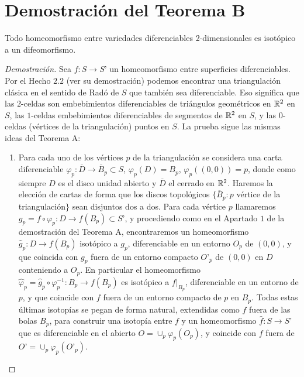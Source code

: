 \section{Demostración del Teorema B}
	\begin{teorb}
		Todo homeomorfismo entre variedades diferenciables 2-dimensionales es isotópico a un difeomorfismo.
	\end{teorb}
	\begin{proof}[Demostración]
		Sea $f:S\to S’$ un homeomorfismo entre superficies diferenciables. Por el Hecho $2.2$ (ver su demostración) podemos encontrar una triangulación clásica en el sentido de Radó de $S$ que también sea diferenciable. Eso significa que las $2$-celdas son embebimientos diferenciables de triángulos geométricos en $\mathbb{R}^2$ en $S$, las  $1$-celdas embebimientos diferenciables de segmentos de $\mathbb{R}^2$ en $S$, y las $0$-celdas (vértices de la triangulación) puntos en $S$. La prueba sigue las mismas ideas del Teorema A:
	\begin{enumerate}
		\item Para cada uno de los vértices $p$ de la triangulación se considera una carta diferenciable $\varphi_p : \overline{D}\to \overline{B}_p\subset S$, $\varphi_p(D)=B_p$, $\varphi_p((0,0))=p$, donde como siempre $D$ es el disco unidad abierto y $ \overline{D}$ el cerrado en $\mathbb{R}^2$. Haremos la elección de cartas de forma que los discos topológicos $\{\overline{B}_p \colon p$ vértice de la triangulación$\}$ sean disjuntos dos a dos. Para cada vértice $p$ llamaremos $g_p=f\circ \varphi_p:D\to f(B_p)\subset S’$, y procediendo como en el Apartado $1$ de la demostración del Teorema A, encontraremos un homeomorfismo $\hat g_p:D\to f(B_p)$ isotópico a  $g_p$, diferenciable en un entorno $O_p$ de $(0,0)$, y que coincida con $g_p$ fuera de un entorno compacto $O’_p$  de $(0,0)$ en $D$ conteniendo a $O_p$. En particular el homeomorfismo $\hat \varphi_p=\hat g_p\circ \varphi_p^{-1}:B_p\to f(B_p)$ es isotópico a  $f|_{B_p}$, diferenciable en un entorno de $p$, y que coincide con $f$ fuera de un entorno compacto de $p$ en $B_p$. Todas estas últimas isotopías se pegan de forma natural, extendidas como $f$ fuera de las bolas $B_p$, para construir una isotopía entre $f$ y un homeomorfismo $\hat f\colon S\to S’$ que es diferenciable en el abierto  $O=\cup_p \varphi_p(O_p)$, y coincide con $f$ fuera de  $O’=\cup_p \varphi_p(O’_p)$.


\end{enumerate}
\end{proof}

